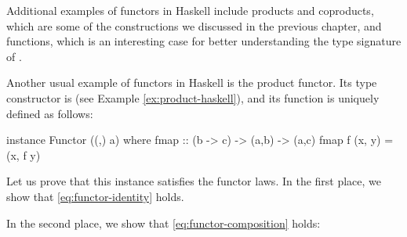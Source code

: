 Additional examples of functors in Haskell include products and
coproducts, which are some of the constructions we discussed in the
previous chapter, and functions, which is an interesting case for
better understanding the type signature of .

\begin{example}
  \label{ex:functor-product-haskell}


  Another usual example of functors in Haskell is the product functor.
  Its type constructor is  (see Example
  \ref{ex:product-haskell}), and its  function is
  uniquely defined as follows:
  \begin{codehaskell}
instance Functor ((,) a) where
  fmap :: (b -> c) -> (a,b) -> (a,c)
  fmap f (x, y) = (x, f y)
  \end{codehaskell}
  Let us prove that this instance satisfies the functor laws. In the
  first place, we show that \eqref{eq:functor-identity} holds.
  \begin{steps}
  \end{steps}
  In the second place, we show that \eqref{eq:functor-composition}
  holds:
  \begin{steps}
  \end{steps}

\end{example}

